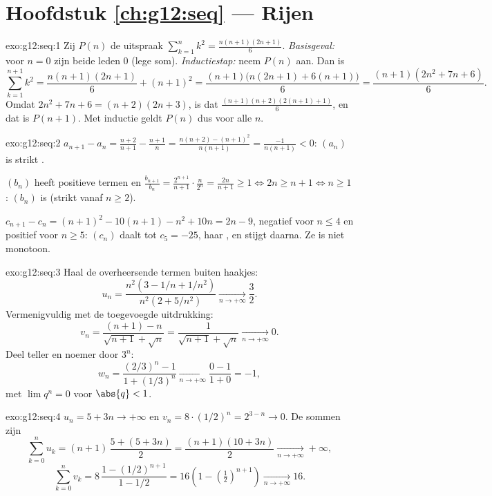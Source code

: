 \section*{Hoofdstuk \ref{ch:g12:seq} --- Rijen}

\begin{solution}{exo:g12:seq:1}
Zij $P(n)$ de uitspraak $\sum_{k=1}^{n} k^2 = \frac{n(n+1)(2n+1)}{6}$.
\emph{Basisgeval:} voor $n = 0$ zijn beide leden $0$ (lege som).
\emph{Inductiestap:} neem $P(n)$ aan. Dan is
\[
\sum_{k=1}^{n+1} k^2 = \frac{n(n+1)(2n+1)}{6} + (n+1)^2
= \frac{(n+1)\bigl(n(2n+1) + 6(n+1)\bigr)}{6}
= \frac{(n+1)(2n^2 + 7n + 6)}{6}.
\]
Omdat $2n^2 + 7n + 6 = (n+2)(2n+3)$, is dat
$\frac{(n+1)(n+2)(2(n+1)+1)}{6}$, en dat is $P(n+1)$. Met inductie geldt
$P(n)$ dus voor alle $n$.
\end{solution}

\begin{solution}{exo:g12:seq:2}
$a_{n+1} - a_n = \frac{n+2}{n+1} - \frac{n+1}{n}
= \frac{n(n+2) - (n+1)^2}{n(n+1)} = \frac{-1}{n(n+1)} < 0$: $(a_n)$ is
strikt .

$(b_n)$ heeft positieve termen en
$\frac{b_{n+1}}{b_n} = \frac{2^{n+1}}{n+1}\cdot\frac{n}{2^n} =
\frac{2n}{n+1} \geq 1 \iff 2n \geq n+1 \iff n \geq 1$: $(b_n)$ is 
(strikt vanaf $n \geq 2$).

$c_{n+1} - c_n = (n+1)^2 - 10(n+1) - n^2 + 10n = 2n - 9$, negatief voor
$n \leq 4$ en positief voor $n \geq 5$: $(c_n)$ daalt tot $c_5 = -25$, haar
, en stijgt daarna. Ze is niet monotoon.
\end{solution}

\begin{solution}{exo:g12:seq:3}
Haal de overheersende termen buiten haakjes:
\[
u_n = \frac{n^2(3 - 1/n + 1/n^2)}{n^2(2 + 5/n^2)} \xrightarrow[n\to+\infty]{} \frac{3}{2}.
\]
Vermenigvuldig met de toegevoegde uitdrukking:
\[
v_n = \frac{(n+1) - n}{\sqrt{n+1} + \sqrt{n}} = \frac{1}{\sqrt{n+1}+\sqrt{n}}
\xrightarrow[n\to+\infty]{} 0.
\]
Deel teller en noemer door $3^n$:
\[
w_n = \frac{(2/3)^n - 1}{1 + (1/3)^n} \xrightarrow[n\to+\infty]{} \frac{0-1}{1+0} = -1,
\]
met $\lim q^n = 0$ voor $\abs{q} < 1$.
\end{solution}

\begin{solution}{exo:g12:seq:4}
$u_n = 5 + 3n \to +\infty$ en $v_n = 8 \cdot (1/2)^n = 2^{3-n} \to 0$. De
sommen zijn
\[
\sum_{k=0}^{n} u_k = (n+1)\,\frac{5 + (5+3n)}{2} = \frac{(n+1)(10+3n)}{2}
\xrightarrow[n\to+\infty]{} +\infty,
\]
\[
\sum_{k=0}^{n} v_k = 8\,\frac{1 - (1/2)^{n+1}}{1 - 1/2}
= 16\left(1 - \left(\tfrac{1}{2}\right)^{n+1}\right)
\xrightarrow[n\to+\infty]{} 16 .
\]
\end{solution}

